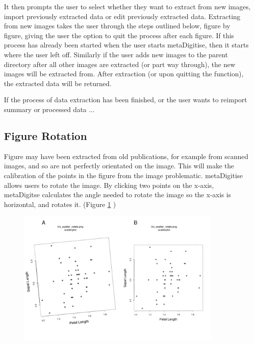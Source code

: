 \documentclass{article}
\begin{document}
It then prompts the user to select whether they want to extract from new images, import previously extracted data or edit previously extracted data. Extracting from new images takes the user through the steps outlined below, figure by figure, giving the user the option to quit the process after each figure. If this process has already been started when the user starts metaDigitise, then it starts where the user left off. Similarly if the user adds new images to the parent directory after all other images are extracted (or part way through), the new images will be extracted from. After extraction (or upon quitting the function), the extracted data will be returned. %


If the process of data extraction has been finished, or the user wants to reimport summary or processed data ...






\subsection{Figure Rotation}
Figure may have been extracted from old publications, for example from scanned images, and so are not perfectly orientated on the image. This will make the calibration of the points in the figure from the image problematic. metaDigitise allows users to rotate the image. By clicking two points on the x-axis, metaDigitse calculates the angle needed to rotate the image so the x-axis is horizontal, and rotates it. (Figure \ref{fig:rotate} )

\begin{figure}[!h] 
 \includegraphics[width=0.9\textwidth]{fig_rotate.pdf} 
 \caption{ }
\label{fig:rotate}
\end{figure}
\end{document}
